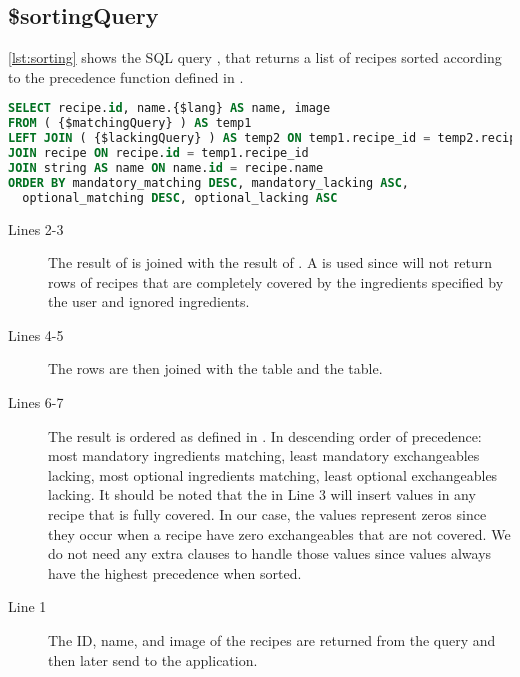 \subsection*{\$sortingQuery}
\autoref{lst:sorting} shows the SQL query , that returns a list of recipes sorted according to the precedence function defined in .
\begin{lstlisting}[language=SQL, float=h, label={lst:sorting}, caption={\$sortingQuery, combine and sort.}]
SELECT recipe.id, name.{$lang} AS name, image
FROM ( {$matchingQuery} ) AS temp1
LEFT JOIN ( {$lackingQuery} ) AS temp2 ON temp1.recipe_id = temp2.recipe_id
JOIN recipe ON recipe.id = temp1.recipe_id
JOIN string AS name ON name.id = recipe.name
ORDER BY mandatory_matching DESC, mandatory_lacking ASC,
  optional_matching DESC, optional_lacking ASC
\end{lstlisting}
\begin{description}
\item[Lines 2-3] The result of  is joined with the result of \linebreak{}. A  is used since  will not return rows of recipes that are completely covered by the ingredients specified by the user and ignored ingredients.
\item[Lines 4-5] The rows are then joined with the  table and the  table. 
\item[Lines 6-7] The result is ordered as defined in . In descending order of precedence: most mandatory ingredients matching, least mandatory exchangeables lacking, most optional ingredients matching, least optional exchangeables lacking. It should be noted that the  in Line 3 will insert  values in any recipe that is fully covered. In our case, the  values represent zeros since they occur when a recipe have zero exchangeables that are not covered. We do not need any extra clauses to handle those  values since  values always have the highest precedence when sorted.
\item[Line 1] The ID, name, and image of the recipes are returned from the query and then later send to the application.
\end{description}





